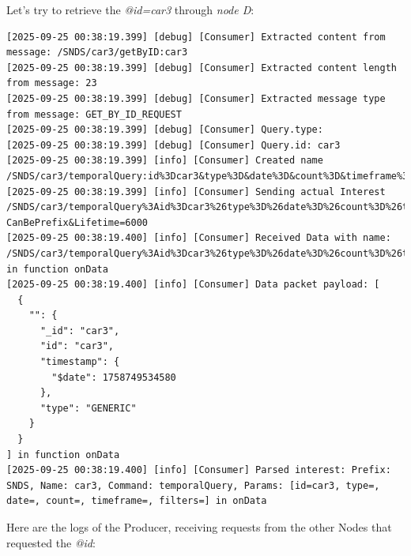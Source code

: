 \documentclass{article}
\begin{document}
Let's try to retrieve the \textit{@id=car3} through \emph{node D}:
\begin{lstlisting}[language=log, caption={Node's D log after performing a GET by ID for car3}, label={lst:node-d-log-file-car3}]
[2025-09-25 00:38:19.399] [debug] [Consumer] Extracted content from message: /SNDS/car3/getByID:car3
[2025-09-25 00:38:19.399] [debug] [Consumer] Extracted content length from message: 23
[2025-09-25 00:38:19.399] [debug] [Consumer] Extracted message type from message: GET_BY_ID_REQUEST
[2025-09-25 00:38:19.399] [debug] [Consumer] Query.type: 
[2025-09-25 00:38:19.399] [debug] [Consumer] Query.id: car3
[2025-09-25 00:38:19.399] [info] [Consumer] Created name /SNDS/car3/temporalQuery:id%3Dcar3&type%3D&date%3D&count%3D&timeframe%3D&filters%3D
[2025-09-25 00:38:19.399] [info] [Consumer] Sending actual Interest /SNDS/car3/temporalQuery%3Aid%3Dcar3%26type%3D%26date%3D%26count%3D%26timeframe%3D%26filters%3D?CanBePrefix&Lifetime=6000
[2025-09-25 00:38:19.400] [info] [Consumer] Received Data with name: /SNDS/car3/temporalQuery%3Aid%3Dcar3%26type%3D%26date%3D%26count%3D%26timeframe%3D%26filters%3D in function onData
[2025-09-25 00:38:19.400] [info] [Consumer] Data packet payload: [
  {
    "": {
      "_id": "car3",
      "id": "car3",
      "timestamp": {
        "$date": 1758749534580
      },
      "type": "GENERIC"
    }
  }
] in function onData
[2025-09-25 00:38:19.400] [info] [Consumer] Parsed interest: Prefix: SNDS, Name: car3, Command: temporalQuery, Params: [id=car3, type=, date=, count=, timeframe=, filters=] in onData
\end{lstlisting}

\pagebreak

Here are the logs of the Producer, receiving requests from the other Nodes that requested the \textit{@id}: 
\end{document}
